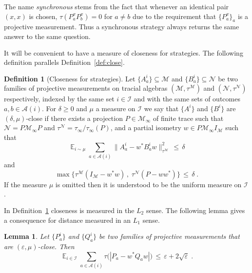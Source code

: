 \documentclass[11pt]{article}
\newtheorem{lemma}[theorem]{Lemma}
\theoremstyle{definition}
\newtheorem{definition}[theorem]{Definition}
\newcommand{\Id}{\ensuremath{I}}
\DeclareMathOperator*{\Expectation}{\mathbb{E}}
\newcommand{\Es}[1]{\Expectation_{#1}}
\newcommand{\mA}{\ensuremath{\mathcal{A}}}
\newcommand{\mM}{\ensuremath{\mathcal{M}}}
\newcommand{\mI}{\ensuremath{\mathcal{I}}}
\newcommand{\cM}{\ensuremath{\mathcal{M}}}
\newcommand{\eps}{\varepsilon}
\newcommand{\mN}{\mathcal{N}}
\begin{document}
The name \emph{synchronous} stems from the fact that whenever an identical pair $(x,x)$ is chosen, $\tau(P^x_a P^x_b)=0$ for $a\neq b$ due to the requirement that $\{P^x_a\}_a$ is a projective measurement. Thus a synchronous strategy always returns the same answer to the same question. %

It will be convenient to have a measure of closeness for strategies. The following definition parallels Definition~\ref{def:close}. 

	\begin{definition}[Closeness for strategies]\label{def:close-meas}
Let $\{A^i_a\}\subseteq \mM$ and $\{B^i_a\}\subseteq \mN$ be two families of projective measurements on  tracial algebras $(\mM,\tau^\mM)$ and $(\mN,\tau^\mN)$ respectively, indexed by the same set $i\in \mI$ and with the same sets of outcomes $a,b\in\mA(i)$. For $\delta\geq0$ and $\mu$ a measure on $\mI$ we say that $\{A^i\}$ and $\{B^i\}$ are $(\delta,\mu)$-close if there exists a projection $P\in\mM_\infty$ of finite trace such that $\mN=P\mM_\infty P$ and $\tau^\mN=\tau_\infty/\tau_\infty(P)$, and a partial isometry $w\in P \mM_\infty \Id_\mM$ such that 
\[ \Es{i\sim\mu} \sum_{a\in\mA(i)} \big\| A^i_a - w^* B^i_a w \big\|_{\tau^\cM}^2 \,\leq\,\delta\]
and 
\[\max\big\{ \tau^\mM(\Id_\mM-w^*w)\,,\; \tau^\mN(P-ww^*)\big\} \,\leq\, \delta\;.\]
If the measure $\mu$ is omitted then it is understood to be the uniform measure on $\mI$.
\end{definition}

In Definition~\ref{def:close-meas} closeness is measured in the $L_2$ sense. The following lemma gives a consequence for distance measured in an $L_1$ sense. 


\begin{lemma}\label{lem:l1-l2}
Let $\{P_a^i\}$ and $\{Q_a^i\}$ be two families of projective measurements that are $(\eps,\mu)$-close. Then 
\begin{equation}\label{eq:l1-l2}
\Es{i\in\mI} \sum_{a\in \mA(i)} \tau\big(|P_a-w^*Q_aw|\big) \,\leq\, \eps+ 2 \sqrt{\eps}\;.
\end{equation}
\end{lemma}
\end{document}
